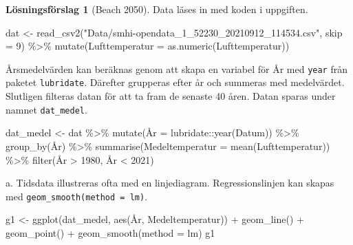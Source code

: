 \documentclass[
]{book}
\newenvironment{Shaded}{\begin{snugshade}}{\end{snugshade}}
\newcommand{\AttributeTok}[1]{\textcolor[rgb]{0.77,0.63,0.00}{#1}}
\newcommand{\DecValTok}[1]{\textcolor[rgb]{0.00,0.00,0.81}{#1}}
\newcommand{\FunctionTok}[1]{\textcolor[rgb]{0.00,0.00,0.00}{#1}}
\newcommand{\NormalTok}[1]{#1}
\newcommand{\OtherTok}[1]{\textcolor[rgb]{0.56,0.35,0.01}{#1}}
\newcommand{\SpecialCharTok}[1]{\textcolor[rgb]{0.00,0.00,0.00}{#1}}
\newcommand{\StringTok}[1]{\textcolor[rgb]{0.31,0.60,0.02}{#1}}
\theoremstyle{definition}
\theoremstyle{definition}
\theoremstyle{definition}
\theoremstyle{definition}
\newtheorem{hypothesis}{Lösningsförslag}[chapter]
\theoremstyle{remark}
\begin{document}
\begin{hypothesis}[Beach 2050]
Data läses in med koden i uppgiften.

\begin{Shaded}
\begin{Highlighting}[]
\NormalTok{dat }\OtherTok{\textless{}{-}} \FunctionTok{read\_csv2}\NormalTok{(}\StringTok{"Data/smhi{-}opendata\_1\_52230\_20210912\_114534.csv"}\NormalTok{, }\AttributeTok{skip =} \DecValTok{9}\NormalTok{) }\SpecialCharTok{\%\textgreater{}\%} 
  \FunctionTok{mutate}\NormalTok{(}\AttributeTok{Lufttemperatur =} \FunctionTok{as.numeric}\NormalTok{(Lufttemperatur))}
\end{Highlighting}
\end{Shaded}

Årsmedelvärden kan beräknas genom att skapa en variabel för År med \texttt{year} från paketet \texttt{lubridate}. Därefter grupperas efter år och summeras med medelvärdet. Slutligen filteras datan för att ta fram de senaste 40 åren. Datan sparas under namnet \texttt{dat\_medel}.

\begin{Shaded}
\begin{Highlighting}[]
\NormalTok{dat\_medel }\OtherTok{\textless{}{-}}\NormalTok{ dat }\SpecialCharTok{\%\textgreater{}\%} 
  \FunctionTok{mutate}\NormalTok{(Å}\AttributeTok{r =}\NormalTok{ lubridate}\SpecialCharTok{::}\FunctionTok{year}\NormalTok{(Datum)) }\SpecialCharTok{\%\textgreater{}\%} 
  \FunctionTok{group\_by}\NormalTok{(År) }\SpecialCharTok{\%\textgreater{}\%} 
  \FunctionTok{summarise}\NormalTok{(}\AttributeTok{Medeltemperatur =} \FunctionTok{mean}\NormalTok{(Lufttemperatur)) }\SpecialCharTok{\%\textgreater{}\%} 
  \FunctionTok{filter}\NormalTok{(År }\SpecialCharTok{\textgreater{}} \DecValTok{1980}\NormalTok{, År }\SpecialCharTok{\textless{}} \DecValTok{2021}\NormalTok{)}
\end{Highlighting}
\end{Shaded}

a. Tidsdata illustreras ofta med en linjediagram. Regressionslinjen kan skapas med \texttt{geom\_smooth(method\ =\ lm)}.

\begin{Shaded}
\begin{Highlighting}[]
\NormalTok{g1 }\OtherTok{\textless{}{-}} \FunctionTok{ggplot}\NormalTok{(dat\_medel, }\FunctionTok{aes}\NormalTok{(År, Medeltemperatur)) }\SpecialCharTok{+} 
  \FunctionTok{geom\_line}\NormalTok{() }\SpecialCharTok{+} 
  \FunctionTok{geom\_point}\NormalTok{() }\SpecialCharTok{+}
  \FunctionTok{geom\_smooth}\NormalTok{(}\AttributeTok{method =}\NormalTok{ lm)}
\NormalTok{g1}
\end{Highlighting}
\end{Shaded}


\end{hypothesis}
\end{document}
